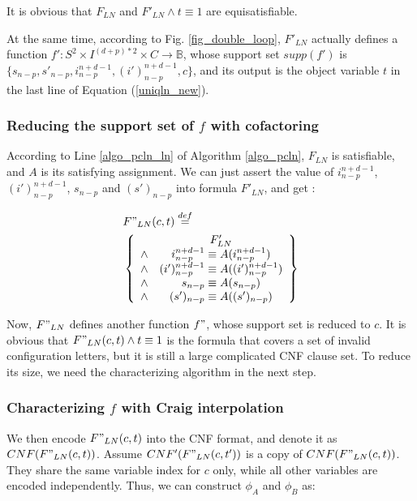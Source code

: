 \documentclass[journal]{IEEEtran}
\begin{document}
It is obvious that $F_{LN}$ and $F'_{LN}\wedge t\equiv 1$ are equisatisfiable.

At the same time,
according to Fig. \ref{fig_double_loop},
$F'_{LN}$ actually defines a function $f':S^{2}\times I^{(d+p)*2}\times C\to \mathbb{B}$,
whose support set $supp(f')$ is $\{s_{n-p},s'_{n-p},i_{n-p}^{n+d-1},(i')_{n-p}^{n+d-1},c\}$,
and its output is the object variable $t$ in the last line of Equation (\ref{uniqln_new}).

\subsubsection{\textbf{Reducing the support set of $f$ with cofactoring}}
According to Line \ref{algo_pcln_ln} of Algorithm \ref{algo_pcln},
$F_{LN}$ is satisfiable,
and $A$ is its satisfying assignment.
We can just assert the value of $i_{n-p}^{n+d-1}$, $(i')_{n-p}^{n+d-1}$, $s_{n-p}$ and $(s')_{n-p}$ into formula $F'_{LN}$,
and get :

\begin{equation}\label{equ_char}
\begin{split}
&F"_{LN}(c,t)\stackrel{def}{=}\\
&\left\{
\begin{array}{cc}
& F'_{LN}\\
\wedge& i_{n-p}^{n+d-1}\equiv A(i_{n-p}^{n+d-1})\\
\wedge& (i')_{n-p}^{n+d-1}\equiv A((i')_{n-p}^{n+d-1})\\
\wedge& s_{n-p}\equiv A(s_{n-p})\\
\wedge& (s')_{n-p}\equiv A((s')_{n-p})
\end{array}
\right\}
\end{split}
\end{equation}

Now,
$F"_{LN}$ defines another function $f"$,
whose support set is reduced to $c$.
It is obvious that $F"_{LN}(c,t)\wedge t\equiv 1$ is the formula that covers a set of invalid configuration letters,
but it is still a large complicated CNF clause set.
To reduce its size,
we need the characterizing algorithm in the next step.

\subsubsection{\textbf{Characterizing $f$ with Craig interpolation}}

We then encode $F"_{LN}(c,t)$ into the CNF format,
and denote it as $CNF(F"_{LN}(c,t))$.
Assume $CNF'(F"_{LN}(c,t'))$ is a copy of $CNF(F"_{LN}(c,t))$.
They share the same variable index for $c$ only,
while all other variables are encoded independently.
Thus,
we can construct $\phi_A$ and $\phi_B$ as:
\end{document}
